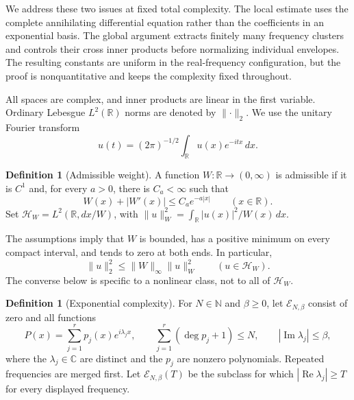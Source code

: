 \documentclass[11pt]{article}
\theoremstyle{definition}
\newtheorem{definition}[theorem]{Definition}
\theoremstyle{remark}
\newcommand{\R}{\mathbb R}
\newcommand{\C}{\mathbb C}
\newcommand{\N}{\mathbb N}
\newcommand{\HH}{\mathcal H_W}
\newcommand{\EE}{\mathcal E_{N,\beta}}
\newcommand{\norm}[1]{\lVert #1\rVert}
\newcommand{\dd}{\,dx}
\DeclareMathOperator{\Rea}{Re}
\DeclareMathOperator{\Ima}{Im}
\begin{document}
We address these two issues at fixed total complexity. The local estimate
uses the complete annihilating differential equation rather than the
coefficients in an exponential basis. The global argument extracts finitely
many frequency clusters and controls their cross inner products before
normalizing individual envelopes. The resulting constants are uniform in
the real-frequency configuration, but the proof is nonquantitative and
keeps the complexity fixed throughout.

All spaces are complex, and inner products are linear in the first
variable. Ordinary Lebesgue $L^2(\R)$ norms are denoted by $\norm{\cdot}_2$.
We use the unitary Fourier transform
\begin{equation}\label{eq:fourier}
 \widehat u(t)=(2\pi)^{-1/2}\int_\R u(x)e^{-itx}\dd.
\end{equation}

\begin{definition}[Admissible weight]\label{def:weight}
A function $W:\R\to(0,\infty)$ is admissible if it is $C^1$ and, for every
$a>0$, there is $C_a<\infty$ such that
\begin{equation}\label{eq:weight}
 W(x)+|W'(x)|\le C_a e^{-a|x|}\qquad(x\in\R).
\end{equation}
Set $\HH=L^2(\R,dx/W)$, with
$\norm{u}_W^2=\int_\R |u(x)|^2/W(x)\dd$.
\end{definition}

The assumptions imply that $W$ is bounded, has a positive minimum on every
compact interval, and tends to zero at both ends. In particular,
\begin{equation}\label{eq:embedding}
 \norm{u}_2^2\le \norm W_\infty\norm{u}_W^2\qquad(u\in\HH).
\end{equation}
The converse below is specific to a nonlinear class, not to all of $\HH$.

\begin{definition}[Exponential complexity]\label{def:complexity}
For $N\in\N$ and $\beta\ge0$, let $\EE$ consist of zero and all functions
\begin{equation}\label{eq:exp-poly}
 P(x)=\sum_{j=1}^r p_j(x)e^{i\lambda_jx},\qquad
 \sum_{j=1}^r(\deg p_j+1)\le N,\qquad |\Ima\lambda_j|\le\beta,
\end{equation}
where the $\lambda_j\in\C$ are distinct and the $p_j$ are nonzero
polynomials. Repeated frequencies are merged first. Let $\EE(T)$ be the
subclass for which $|\Rea\lambda_j|\ge T$ for every displayed frequency.
\end{definition}
\end{document}
